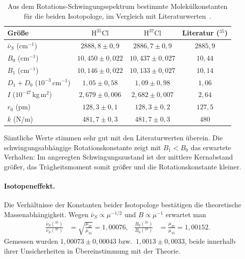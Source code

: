 \documentclass[11pt,a4paper]{article}
\begin{document}
\begin{table}[H]
  \centering
  \caption{Aus dem Rotations-Schwingungsspektrum bestimmte Molekülkonstanten für
    die beiden Isotopologe, im Vergleich mit Literaturwerten~\cite{Rinsland,Demtroeder}.}
  \label{tab:a5}
  \begin{tabular}{lccc}
    \toprule
    Größe & $\mathrm{H}^{35}\mathrm{Cl}$ & $\mathrm{H}^{37}\mathrm{Cl}$ & Literatur ($^{35}$)\\
    \midrule
    $\bar\nu_S$ (cm$^{-1}$)       & $2888{,}8 \pm 0{,}9$ & $2886{,}7 \pm 0{,}9$ & $2885{,}9$\\
    $B_0$ (cm$^{-1}$)             & $10{,}450 \pm 0{,}022$ & $10{,}437 \pm 0{,}027$ & $10{,}44$\\
    $B_1$ (cm$^{-1}$)             & $10{,}146 \pm 0{,}022$ & $10{,}133 \pm 0{,}027$ & $10{,}14$\\
    $D_1{+}D_0$ ($10^{-3}\,$cm$^{-1}$) & $1{,}05 \pm 0{,}58$ & $1{,}09 \pm 0{,}98$ & $1{,}06$\\
    $I$ ($10^{-47}\,$kg\,m$^2$)   & $2{,}679 \pm 0{,}006$ & $2{,}682 \pm 0{,}007$ & $2{,}64$\\
    $r_0$ (pm)                    & $128{,}3 \pm 0{,}1$ & $128{,}3 \pm 0{,}2$ & $127{,}5$\\
    $k$ (N/m)                     & $481{,}7 \pm 0{,}3$ & $481{,}7 \pm 0{,}3$ & $480$\\
    \bottomrule
  \end{tabular}
\end{table}

Sämtliche Werte stimmen sehr gut mit den Literaturwerten überein. Die
schwingungsabhängige Rotationskonstante zeigt mit $B_1 < B_0$ das erwartete
Verhalten: Im angeregten Schwingungszustand ist der mittlere Kernabstand größer,
das Trägheitsmoment somit größer und die Rotationskonstante kleiner.

\paragraph{Isotopeneffekt.}
Die Verhältnisse der Konstanten beider Isotopologe bestätigen die theoretische
Massenabhängigkeit. Wegen $\bar\nu_S \propto \mu^{-1/2}$ und $B \propto \mu^{-1}$
erwartet man
\begin{align*}
  \frac{\bar\nu_S(^{35})}{\bar\nu_S(^{37})} &= \sqrt{\frac{\mu_{37}}{\mu_{35}}} = 1{,}00076,
  & \frac{B_0(^{35})}{B_0(^{37})} &= \frac{\mu_{37}}{\mu_{35}} = 1{,}00152 .
\end{align*}
Gemessen wurden $1{,}00073\pm0{,}00043$ bzw.\ $1{,}0013\pm0{,}0033$, beide
innerhalb ihrer Unsicherheiten in Übereinstimmung mit der Theorie.
\end{document}
